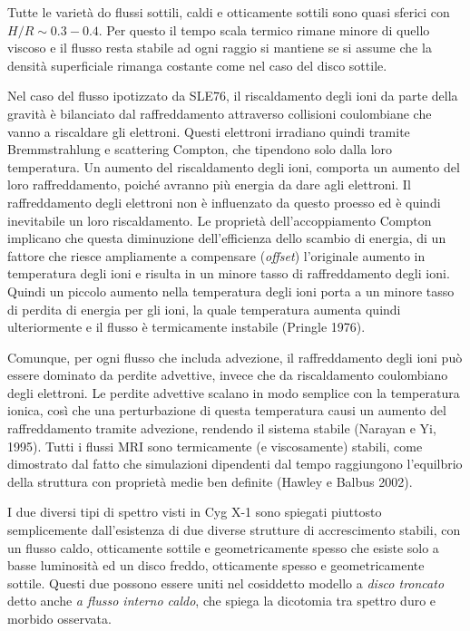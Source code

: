 \documentclass[a4paperbi]{article}
\begin{document}
	Tutte le varietà do flussi sottili, caldi e otticamente sottili sono quasi sferici con $H/R\sim0.3-0.4$. Per questo il tempo scala termico rimane minore di quello viscoso e il flusso resta stabile ad ogni raggio si mantiene se si assume che la densità superficiale rimanga costante come nel caso del disco sottile.
	
	Nel caso del flusso ipotizzato da SLE76, il riscaldamento degli ioni da parte della gravità è bilanciato dal raffreddamento attraverso collisioni coulombiane che vanno a riscaldare gli elettroni. Questi elettroni irradiano quindi tramite Bremmstrahlung e scattering Compton, che tipendono solo dalla loro temperatura. Un aumento del riscaldamento degli ioni, comporta un aumento del loro raffreddamento, poiché avranno più energia da dare agli elettroni. Il raffreddamento degli elettroni non è influenzato da questo proesso ed è quindi inevitabile un loro riscaldamento. Le proprietà dell'accoppiamento Compton implicano che questa diminuzione dell'efficienza dello scambio di energia, di un fattore che riesce ampliamente a compensare (\textit{offset}) l'originale aumento in temperatura degli ioni e risulta in un minore tasso di raffreddamento degli ioni. Quindi un piccolo aumento nella temperatura degli ioni porta a un minore tasso di perdita di energia per gli ioni, la quale temperatura aumenta quindi ulteriormente e il flusso è termicamente instabile (Pringle 1976).
	
	Comunque, per ogni flusso che includa advezione, il raffreddamento degli ioni può essere dominato da perdite advettive, invece che da riscaldamento coulombiano degli elettroni. Le perdite advettive scalano in modo semplice con la temperatura ionica, così che una perturbazione di questa temperatura causi un aumento del raffreddamento tramite advezione, rendendo il sistema stabile (Narayan e Yi, 1995). Tutti i flussi MRI sono termicamente  (e viscosamente) stabili, come dimostrato dal fatto che simulazioni dipendenti dal tempo raggiungono l'equilbrio della struttura con proprietà medie ben definite (Hawley e Balbus 2002).
	
I due diversi tipi di spettro visti in Cyg X-1 sono spiegati piuttosto semplicemente dall'esistenza di due diverse strutture di accrescimento stabili, con un flusso caldo, otticamente sottile e geometricamente spesso che esiste solo a basse luminosità ed un disco freddo, otticamente spesso e geometricamente sottile. Questi due possono essere uniti nel cosiddetto modello a \textit{disco troncato} detto anche \textit{a flusso interno caldo}, che spiega la dicotomia tra spettro duro e morbido osservata.
\end{document}

